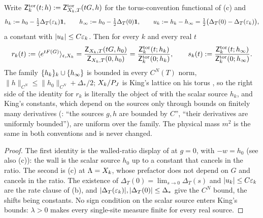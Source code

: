 \begin{lemma}\label{rot:lem:H6conv}
Write $\mathsf Z^{\rm tor}_k(t;h):=\mathsf Z^{\rm tor}_{X_k,T}(tG,h)$ for the torus-convention functional of (c) and
\[
h_k:= h_0-\tfrac12\Delta_T(\varepsilon_k)\mathbf 1,\qquad h_\infty:= h_0-\tfrac12\Delta_T(0)\mathbf 1,\qquad u_k:= h_k-h_\infty=\tfrac12\big(\Delta_T(0)-\Delta_T(\varepsilon_k)\big),
\]
a constant with $|u_k|\le C\varepsilon_k$. Then for every $k$ and every real $t$
\[
r_k(t):=\langle e^{tF(G)}\rangle_{\mathfrak c,X_k}=\frac{\mathsf Z_{X_k,T}(tG,h_0)}{\mathsf Z_{X_k,T}(0,h_0)}=\frac{\mathsf Z^{\rm tor}_k(t;h_k)}{\mathsf Z^{\rm tor}_k(0;h_k)},\qquad s_k(t):=\frac{\mathsf Z^{\rm tor}_k(t;h_\infty)}{\mathsf Z^{\rm tor}_k(0;h_\infty)} .
\]
The family $\{h_k\}_{k}\cup\{h_\infty\}$ is bounded in every $C^N(T)$ norm, $\|h\|_{C^N}\le\|h_0\|_{C^N}+\Delta_*/2$; $X_k/P_J$ is King's lattice on his torus \cite[(2.21)]{K1}, so the right side of the identity for $r_k$ is literally the object of \cite[Thms.~3.1, 3.4]{K1} with the scalar source $h_k$, and King's constants, which depend on the sources only through bounds on finitely many derivatives (\cite[pp.~664--665, 677]{K1}: ``the sources $g,h$ are bounded by $C$'', ``their derivatives are uniformly bounded''), are uniform over the family. The physical mass $m^2$ is the same in both conventions and is never changed.
\end{lemma}
\begin{proof}
The first identity is the walled-ratio display of  at $g=0$, with $-w=h_0$ (see also (c)): the wall is the scalar source $h_0$ up to a constant that cancels in the ratio. The second is (c) at $\Lambda=X_k$, whose prefactor does not depend on $G$ and cancels in the ratio. The existence of $\Delta_T(0)=\lim_{s\to0}\Delta_T(s)$ and $|u_k|\le C\varepsilon_k$ are the rate clause of (b), and $|\Delta_T(\varepsilon_k)|,|\Delta_T(0)|\le\Delta_*$ give the $C^N$ bound, the shifts being constants. No sign condition on the scalar source enters King's bounds: $\lambda>0$ makes every single-site measure finite for every real source.
\end{proof}

